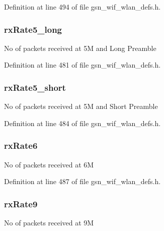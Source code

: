 Definition at line 494 of file gsn\_\-wif\_\-wlan\_\-defs.h.

\hypertarget{a00419_a7b9f0d9e5077367d2ca6d1663b634bb0}{
\subsubsection[{rxRate5\_\-long}]{ {\bf rxRate5\_\-long}}}
\label{a00419_a7b9f0d9e5077367d2ca6d1663b634bb0}
No of packets received at 5M and Long Preamble 

Definition at line 481 of file gsn\_\-wif\_\-wlan\_\-defs.h.

\hypertarget{a00419_a39494e501e6828fd3c67e9ccb82b1b3b}{
\subsubsection[{rxRate5\_\-short}]{ {\bf rxRate5\_\-short}}}
\label{a00419_a39494e501e6828fd3c67e9ccb82b1b3b}
No of packets received at 5M and Short Preamble 

Definition at line 484 of file gsn\_\-wif\_\-wlan\_\-defs.h.

\hypertarget{a00419_a426acaa47c821b3bb40f4433ca92039c}{
\subsubsection[{rxRate6}]{ {\bf rxRate6}}}
\label{a00419_a426acaa47c821b3bb40f4433ca92039c}
No of packets received at 6M 

Definition at line 487 of file gsn\_\-wif\_\-wlan\_\-defs.h.

\hypertarget{a00419_a1ab6b1ab905665c0ffb80d34860981bb}{
\subsubsection[{rxRate9}]{ {\bf rxRate9}}}
\label{a00419_a1ab6b1ab905665c0ffb80d34860981bb}
No of packets received at 9M 

